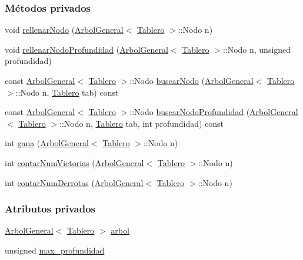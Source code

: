 \subsubsection*{Métodos privados}
\begin{DoxyCompactItemize}
\item 
void \hyperlink{classJugadorAuto_ae90fa3f90f9f0357a1e04512e1352f80}{rellenar\-Nodo} (\hyperlink{classArbolGeneral}{Arbol\-General}$<$ \hyperlink{classTablero}{Tablero} $>$\-::Nodo n)
\item 
void \hyperlink{classJugadorAuto_add87179bcda9c297dfe06ca327a3de84}{rellenar\-Nodo\-Profundidad} (\hyperlink{classArbolGeneral}{Arbol\-General}$<$ \hyperlink{classTablero}{Tablero} $>$\-::Nodo n, unsigned profundidad)
\item 
const \hyperlink{classArbolGeneral}{Arbol\-General}$<$ \hyperlink{classTablero}{Tablero} $>$\-::Nodo \hyperlink{classJugadorAuto_ace20f5c31c291f99491df06b356ae37d}{buscar\-Nodo} (\hyperlink{classArbolGeneral}{Arbol\-General}$<$ \hyperlink{classTablero}{Tablero} $>$\-::Nodo n, \hyperlink{classTablero}{Tablero} tab) const 
\item 
const \hyperlink{classArbolGeneral}{Arbol\-General}$<$ \hyperlink{classTablero}{Tablero} $>$\-::Nodo \hyperlink{classJugadorAuto_aeeda871eb999ffc3e9d4a87cdcc01e7d}{buscar\-Nodo\-Profundidad} (\hyperlink{classArbolGeneral}{Arbol\-General}$<$ \hyperlink{classTablero}{Tablero} $>$\-::Nodo n, \hyperlink{classTablero}{Tablero} tab, int profundidad) const 
\item 
int \hyperlink{classJugadorAuto_ac549b60abbbae7245321cf7436382de6}{gana} (\hyperlink{classArbolGeneral}{Arbol\-General}$<$ \hyperlink{classTablero}{Tablero} $>$\-::Nodo n)
\item 
int \hyperlink{classJugadorAuto_a79ebbd4001280b8d81f1bdb8376214e5}{contar\-Num\-Victorias} (\hyperlink{classArbolGeneral}{Arbol\-General}$<$ \hyperlink{classTablero}{Tablero} $>$\-::Nodo n)
\item 
int \hyperlink{classJugadorAuto_a131bba1aecfc13b5fc16f3f287fb5f42}{contar\-Num\-Derrotas} (\hyperlink{classArbolGeneral}{Arbol\-General}$<$ \hyperlink{classTablero}{Tablero} $>$\-::Nodo n)
\end{DoxyCompactItemize}
\subsubsection*{Atributos privados}
\begin{DoxyCompactItemize}
\item 
\hyperlink{classArbolGeneral}{Arbol\-General}$<$ \hyperlink{classTablero}{Tablero} $>$ \hyperlink{classJugadorAuto_a0ceb9994f364572f00abf5c490b50319}{arbol}
\item 
unsigned \hyperlink{classJugadorAuto_a442a2ba01ebcc71283833176e214b7d3}{max\-\_\-profundidad}
\end{DoxyCompactItemize}


